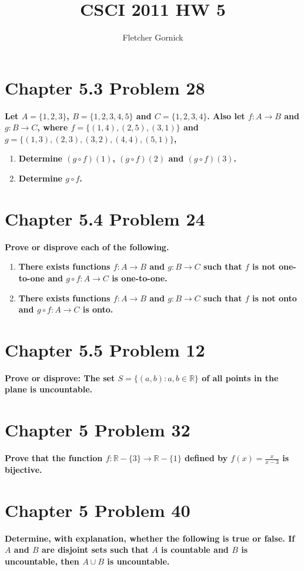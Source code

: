 \documentclass[10pt]{article}
\title{CSCI 2011 HW 5}
\author{Fletcher Gornick}
\begin{document}
\maketitle

\section{Chapter 5.3 Problem 28}
\textbf{Let $A = \{1,2,3\}$, $B = \{1,2,3,4,5\}$ and $C = \{1,2,3,4\}$.  Also let $f: A \to B$ and $g: B \to C$,
where $f = \{(1,4), (2,5), (3,1)\}$ and $g = \{(1,3), (2,3), (3,2), (4,4), (5,1)\}$,}

\begin{enumerate}[label=(\alph*)]

    \item \textbf{Determine $(g \circ f)(1)$, $(g \circ f)(2)$ and $(g \circ f)(3)$.}

    \item \textbf{Determine $g \circ f$.}

\end{enumerate}



\section{Chapter 5.4 Problem 24}
\textbf{Prove or disprove each of the following.}

\begin{enumerate}[label=(\alph*)]

    \item \textbf{There exists functions $f: A \to B$ and $g: B \to C$ such that $f$ is not one-to-one and $g \circ f: A \to C$
        is one-to-one.}

    \item \textbf{There exists functions $f: A \to B$ and $g: B \to C$ such that $f$ is not onto and $g \circ f: A \to C$ is onto.}

\end{enumerate}



\section{Chapter 5.5 Problem 12}
\textbf{Prove or disprove: The set $S = \{(a,b): a,b \in \mathbb{R}\}$ of all points in the plane is uncountable.}



\section{Chapter 5 Problem 32}
\textbf{Prove that the function $f: \mathbb{R} - \{3\} \to \mathbb{R} - \{1\}$ defined by $f(x) = \frac{x}{x-3}$ is bijective.}



\section{Chapter 5 Problem 40}
\textbf{Determine, with explanation, whether the following is true or false.  If $A$ and $B$ are disjoint sets such that $A$ is countable
and $B$ is uncountable, then $A \cup B$ is uncountable.}
\end{document}
